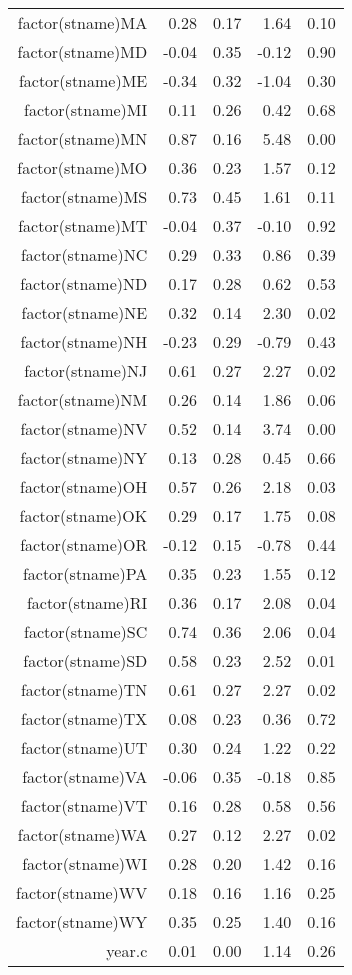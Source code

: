 \begin{table}[ht]
\begin{tabular}{rrrrr}
  factor(stname)MA & 0.28 & 0.17 & 1.64 & 0.10 \\ 
  factor(stname)MD & -0.04 & 0.35 & -0.12 & 0.90 \\ 
  factor(stname)ME & -0.34 & 0.32 & -1.04 & 0.30 \\ 
  factor(stname)MI & 0.11 & 0.26 & 0.42 & 0.68 \\ 
  factor(stname)MN & 0.87 & 0.16 & 5.48 & 0.00 \\ 
  factor(stname)MO & 0.36 & 0.23 & 1.57 & 0.12 \\ 
  factor(stname)MS & 0.73 & 0.45 & 1.61 & 0.11 \\ 
  factor(stname)MT & -0.04 & 0.37 & -0.10 & 0.92 \\ 
  factor(stname)NC & 0.29 & 0.33 & 0.86 & 0.39 \\ 
  factor(stname)ND & 0.17 & 0.28 & 0.62 & 0.53 \\ 
  factor(stname)NE & 0.32 & 0.14 & 2.30 & 0.02 \\ 
  factor(stname)NH & -0.23 & 0.29 & -0.79 & 0.43 \\ 
  factor(stname)NJ & 0.61 & 0.27 & 2.27 & 0.02 \\ 
  factor(stname)NM & 0.26 & 0.14 & 1.86 & 0.06 \\ 
  factor(stname)NV & 0.52 & 0.14 & 3.74 & 0.00 \\ 
  factor(stname)NY & 0.13 & 0.28 & 0.45 & 0.66 \\ 
  factor(stname)OH & 0.57 & 0.26 & 2.18 & 0.03 \\ 
  factor(stname)OK & 0.29 & 0.17 & 1.75 & 0.08 \\ 
  factor(stname)OR & -0.12 & 0.15 & -0.78 & 0.44 \\ 
  factor(stname)PA & 0.35 & 0.23 & 1.55 & 0.12 \\ 
  factor(stname)RI & 0.36 & 0.17 & 2.08 & 0.04 \\ 
  factor(stname)SC & 0.74 & 0.36 & 2.06 & 0.04 \\ 
  factor(stname)SD & 0.58 & 0.23 & 2.52 & 0.01 \\ 
  factor(stname)TN & 0.61 & 0.27 & 2.27 & 0.02 \\ 
  factor(stname)TX & 0.08 & 0.23 & 0.36 & 0.72 \\ 
  factor(stname)UT & 0.30 & 0.24 & 1.22 & 0.22 \\ 
  factor(stname)VA & -0.06 & 0.35 & -0.18 & 0.85 \\ 
  factor(stname)VT & 0.16 & 0.28 & 0.58 & 0.56 \\ 
  factor(stname)WA & 0.27 & 0.12 & 2.27 & 0.02 \\ 
  factor(stname)WI & 0.28 & 0.20 & 1.42 & 0.16 \\ 
  factor(stname)WV & 0.18 & 0.16 & 1.16 & 0.25 \\ 
  factor(stname)WY & 0.35 & 0.25 & 1.40 & 0.16 \\ 
  year.c & 0.01 & 0.00 & 1.14 & 0.26 \\ 
   \hline
\end{tabular}
\end{table}
